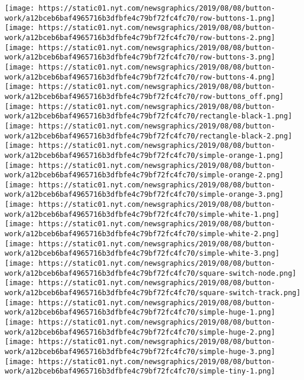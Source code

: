 \texttt{[image: https://static01.nyt.com/newsgraphics/2019/08/08/button-work/a12bceb6baf4965716b3dfbfe4c79bf72fc4fc70/row-buttons-1.png]}
\texttt{[image: https://static01.nyt.com/newsgraphics/2019/08/08/button-work/a12bceb6baf4965716b3dfbfe4c79bf72fc4fc70/row-buttons-2.png]}
\texttt{[image: https://static01.nyt.com/newsgraphics/2019/08/08/button-work/a12bceb6baf4965716b3dfbfe4c79bf72fc4fc70/row-buttons-3.png]}
\texttt{[image: https://static01.nyt.com/newsgraphics/2019/08/08/button-work/a12bceb6baf4965716b3dfbfe4c79bf72fc4fc70/row-buttons-4.png]}
\texttt{[image: https://static01.nyt.com/newsgraphics/2019/08/08/button-work/a12bceb6baf4965716b3dfbfe4c79bf72fc4fc70/row-buttons\_off.png]}
\texttt{[image: https://static01.nyt.com/newsgraphics/2019/08/08/button-work/a12bceb6baf4965716b3dfbfe4c79bf72fc4fc70/rectangle-black-1.png]}
\texttt{[image: https://static01.nyt.com/newsgraphics/2019/08/08/button-work/a12bceb6baf4965716b3dfbfe4c79bf72fc4fc70/rectangle-black-2.png]}
\texttt{[image: https://static01.nyt.com/newsgraphics/2019/08/08/button-work/a12bceb6baf4965716b3dfbfe4c79bf72fc4fc70/simple-orange-1.png]}
\texttt{[image: https://static01.nyt.com/newsgraphics/2019/08/08/button-work/a12bceb6baf4965716b3dfbfe4c79bf72fc4fc70/simple-orange-2.png]}
\texttt{[image: https://static01.nyt.com/newsgraphics/2019/08/08/button-work/a12bceb6baf4965716b3dfbfe4c79bf72fc4fc70/simple-orange-3.png]}
\texttt{[image: https://static01.nyt.com/newsgraphics/2019/08/08/button-work/a12bceb6baf4965716b3dfbfe4c79bf72fc4fc70/simple-white-1.png]}
\texttt{[image: https://static01.nyt.com/newsgraphics/2019/08/08/button-work/a12bceb6baf4965716b3dfbfe4c79bf72fc4fc70/simple-white-2.png]}
\texttt{[image: https://static01.nyt.com/newsgraphics/2019/08/08/button-work/a12bceb6baf4965716b3dfbfe4c79bf72fc4fc70/simple-white-3.png]}
\texttt{[image: https://static01.nyt.com/newsgraphics/2019/08/08/button-work/a12bceb6baf4965716b3dfbfe4c79bf72fc4fc70/square-switch-node.png]}
\texttt{[image: https://static01.nyt.com/newsgraphics/2019/08/08/button-work/a12bceb6baf4965716b3dfbfe4c79bf72fc4fc70/square-switch-track.png]}
\texttt{[image: https://static01.nyt.com/newsgraphics/2019/08/08/button-work/a12bceb6baf4965716b3dfbfe4c79bf72fc4fc70/simple-huge-1.png]}
\texttt{[image: https://static01.nyt.com/newsgraphics/2019/08/08/button-work/a12bceb6baf4965716b3dfbfe4c79bf72fc4fc70/simple-huge-2.png]}
\texttt{[image: https://static01.nyt.com/newsgraphics/2019/08/08/button-work/a12bceb6baf4965716b3dfbfe4c79bf72fc4fc70/simple-huge-3.png]}
\texttt{[image: https://static01.nyt.com/newsgraphics/2019/08/08/button-work/a12bceb6baf4965716b3dfbfe4c79bf72fc4fc70/simple-tiny-1.png]}

